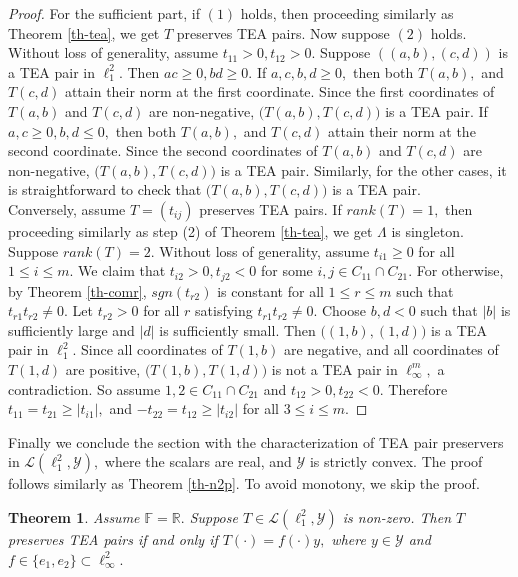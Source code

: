 \documentclass{amsart}
\newtheorem{theorem}{Theorem}[section]
\theoremstyle{definition}
\theoremstyle{remark}
\numberwithin{equation}{section}
\begin{document}
\begin{proof}
	For the sufficient part, if $(1)$ holds, then proceeding similarly as Theorem \ref{th-tea}, we get $T$ preserves TEA pairs. Now suppose $(2)$ holds. Without loss of generality, assume $t_{11}>0,t_{12}>0.$ Suppose $((a,b),(c,d))$ is a TEA pair in $\ell_1^2.$ Then $ac\geq 0,bd\geq 0.$  If $a,c,b,d\geq 0,$ then both $T(a,b),$ and $T(c,d)$ attain their norm at the first coordinate. Since the first coordinates of  $T(a,b)$ and $T(c,d)$ are non-negative, $\Big(T(a,b),T(c,d)\Big)$ is a TEA pair.   If $a,c\geq 0, b,d\leq 0,$ then both $T(a,b),$ and $T(c,d)$ attain their norm at the second coordinate. Since the second coordinates of  $T(a,b)$ and $T(c,d)$ are non-negative, $\Big(T(a,b),T(c,d)\Big)$ is a TEA pair. Similarly, for the other cases, it is straightforward to check that  $\Big(T(a,b),T(c,d)\Big)$ is a TEA pair.   \\
	
	Conversely, assume $T=(t_{ij})$ preserves TEA pairs. If $rank(T)=1,$ then proceeding similarly as step (2) of Theorem \ref{th-tea}, we get $\Lambda$ is singleton. Suppose $rank(T)=2.$ Without loss of generality, assume $t_{i1}\geq 0$ for all $1\leq i\leq m.$ We claim that $t_{i2}>0,t_{j2}<0$ for some $i,j\in C_{11}\cap C_{21}.$ For otherwise, by Theorem \ref{th-comr}, $sgn(t_{r2})$ is constant for all $1\leq r\leq m$ such that $t_{r1}t_{r2}\neq 0.$ Let $t_{r2}>0$ for all $r$ satisfying $t_{r1}t_{r2}\neq 0.$ Choose $b,d<0$ such that $|b|$ is sufficiently large and $|d|$ is sufficiently small. Then $\Big((1,b),(1,d)\Big)$ is a TEA pair in $\ell_1^2.$ Since all coordinates of $T(1,b)$ are negative, and all  coordinates of $T(1,d)$ are positive,   $\Big(T(1,b),T(1,d)\Big)$ is not a TEA pair in $\ell_\infty^m,$ a contradiction. So assume $1,2\in C_{11}\cap C_{21}$ and $t_{12}>0,t_{22}<0.$ Therefore $t_{11}=t_{21}\geq |t_{i1}|,$ and $ -t_{22}=t_{12}\geq |t_{i2}|$ for all $3\leq i\leq m.$
	\end{proof}



Finally we conclude the section with the characterization of TEA pair preservers in $\mathcal{L}(\ell_1^2,\mathcal{Y}),$ where the scalars are real, and $\mathcal{Y}$ is strictly convex. The proof follows similarly as Theorem \ref{th-n2p}. To avoid monotony, we skip the proof.  

\begin{theorem}\label{th-ltea}
Assume $\mathbb{F}=\mathbb{R}.$ Suppose $T\in\mathcal{L}(\ell_1^2,\mathcal{Y})$ is non-zero.   Then $T$ preserves TEA pairs if and only if $T(\cdot)=f(\cdot)y,$ where $y\in \mathcal{Y}$ and $f\in \{e_1,e_2\}\subset \ell_\infty^2.$

\end{theorem}
\end{document}
